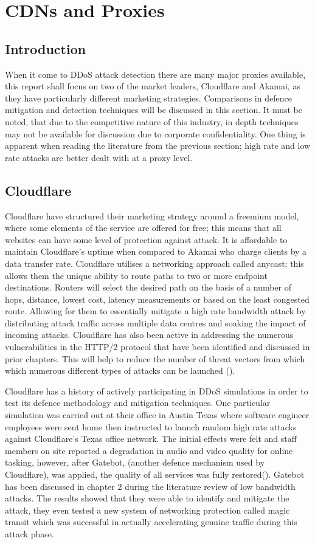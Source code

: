 \section{CDNs and Proxies}
\subsection{Introduction}
When it come to DDoS attack detection there are many major proxies available, this report shall focus on two of the market leaders, Cloudflare and Akamai, as they have particularly different marketing strategies. Comparisons in defence mitigation and detection techniques will be discussed in this section. It must be noted, that due to the competitive nature of this industry, in depth techniques may not be available for discussion due to corporate confidentiality. One thing is apparent when reading the literature from the previous section; high rate and low rate attacks are better dealt with at a proxy level.
\subsection{Cloudflare}
Cloudflare have structured their marketing strategy around a freemium model, where some elements of the service are offered for free; this means that all websites can have some level of protection against attack. It is affordable to maintain Cloudflare's uptime when compared to Akamai who charge clients by a data transfer rate. Cloudflare utilises a networking approach called anycast; this allows them the unique ability to route paths to two or more endpoint destinations. Routers will select the desired path on the basis of a number of hops, distance, lowest cost, latency measurements or based on the least congested route. Allowing for them to essentially mitigate a high rate bandwidth attack by distributing attack traffic across multiple data centres and soaking the impact of incoming attacks. Cloudflare has also been active in addressing the numerous vulnerabilities in the HTTP/2 protocol that have been identified and discussed in prior chapters. This will help to reduce the number of threat vectors from which which numerous different types of attacks can be launched (\cite{CFHTTP2}).

Cloudflare has a history of actively participating in DDoS simulations in order to test its defence methodology and mitigation techniques. One particular simulation was carried out at their office in Austin Texas where software engineer employees were sent home then instructed to launch random high rate attacks against Cloudflare's Texas office network. The initial effects were felt and staff members on site reported a degradation in audio and video quality for online tasking, however, after Gatebot, (another defence mechanism used by Cloudflare), was applied, the quality of all services was fully restored(\cite{CFAustin}). Gatebot has been discussed in chapter 2 during the literature review of low bandwidth attacks. The results showed that they were able to identify and mitigate the attack, they even tested a new system of networking protection called magic transit which was successful in actually accelerating genuine traffic during this attack phase.

